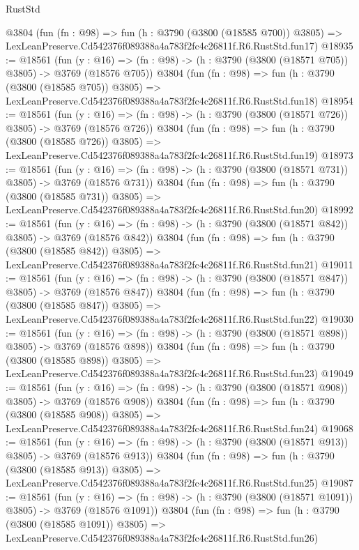 \begin{lexlean}{RustStd}
\begin{coremodule}
    @3804
    (fun (fn : @98) =>
    fun (h : @3790 (@3800 (@18585 @700)) @3805) =>
    LexLeanPreserve.Cd542376f089388a4a783f2fc4c26811f.R6.RustStd.fun17)
@18935 := @18561
    (fun (y : @16) => (fn : @98) -> (h : @3790 (@3800 (@18571 @705)) @3805) -> @3769 (@18576 @705))
    @3804
    (fun (fn : @98) =>
    fun (h : @3790 (@3800 (@18585 @705)) @3805) =>
    LexLeanPreserve.Cd542376f089388a4a783f2fc4c26811f.R6.RustStd.fun18)
@18954 := @18561
    (fun (y : @16) => (fn : @98) -> (h : @3790 (@3800 (@18571 @726)) @3805) -> @3769 (@18576 @726))
    @3804
    (fun (fn : @98) =>
    fun (h : @3790 (@3800 (@18585 @726)) @3805) =>
    LexLeanPreserve.Cd542376f089388a4a783f2fc4c26811f.R6.RustStd.fun19)
@18973 := @18561
    (fun (y : @16) => (fn : @98) -> (h : @3790 (@3800 (@18571 @731)) @3805) -> @3769 (@18576 @731))
    @3804
    (fun (fn : @98) =>
    fun (h : @3790 (@3800 (@18585 @731)) @3805) =>
    LexLeanPreserve.Cd542376f089388a4a783f2fc4c26811f.R6.RustStd.fun20)
@18992 := @18561
    (fun (y : @16) => (fn : @98) -> (h : @3790 (@3800 (@18571 @842)) @3805) -> @3769 (@18576 @842))
    @3804
    (fun (fn : @98) =>
    fun (h : @3790 (@3800 (@18585 @842)) @3805) =>
    LexLeanPreserve.Cd542376f089388a4a783f2fc4c26811f.R6.RustStd.fun21)
@19011 := @18561
    (fun (y : @16) => (fn : @98) -> (h : @3790 (@3800 (@18571 @847)) @3805) -> @3769 (@18576 @847))
    @3804
    (fun (fn : @98) =>
    fun (h : @3790 (@3800 (@18585 @847)) @3805) =>
    LexLeanPreserve.Cd542376f089388a4a783f2fc4c26811f.R6.RustStd.fun22)
@19030 := @18561
    (fun (y : @16) => (fn : @98) -> (h : @3790 (@3800 (@18571 @898)) @3805) -> @3769 (@18576 @898))
    @3804
    (fun (fn : @98) =>
    fun (h : @3790 (@3800 (@18585 @898)) @3805) =>
    LexLeanPreserve.Cd542376f089388a4a783f2fc4c26811f.R6.RustStd.fun23)
@19049 := @18561
    (fun (y : @16) => (fn : @98) -> (h : @3790 (@3800 (@18571 @908)) @3805) -> @3769 (@18576 @908))
    @3804
    (fun (fn : @98) =>
    fun (h : @3790 (@3800 (@18585 @908)) @3805) =>
    LexLeanPreserve.Cd542376f089388a4a783f2fc4c26811f.R6.RustStd.fun24)
@19068 := @18561
    (fun (y : @16) => (fn : @98) -> (h : @3790 (@3800 (@18571 @913)) @3805) -> @3769 (@18576 @913))
    @3804
    (fun (fn : @98) =>
    fun (h : @3790 (@3800 (@18585 @913)) @3805) =>
    LexLeanPreserve.Cd542376f089388a4a783f2fc4c26811f.R6.RustStd.fun25)
@19087 := @18561
    (fun (y : @16) =>
    (fn : @98) -> (h : @3790 (@3800 (@18571 @1091)) @3805) -> @3769 (@18576 @1091))
    @3804
    (fun (fn : @98) =>
    fun (h : @3790 (@3800 (@18585 @1091)) @3805) =>
    LexLeanPreserve.Cd542376f089388a4a783f2fc4c26811f.R6.RustStd.fun26)

\end{coremodule}
\end{lexlean}
